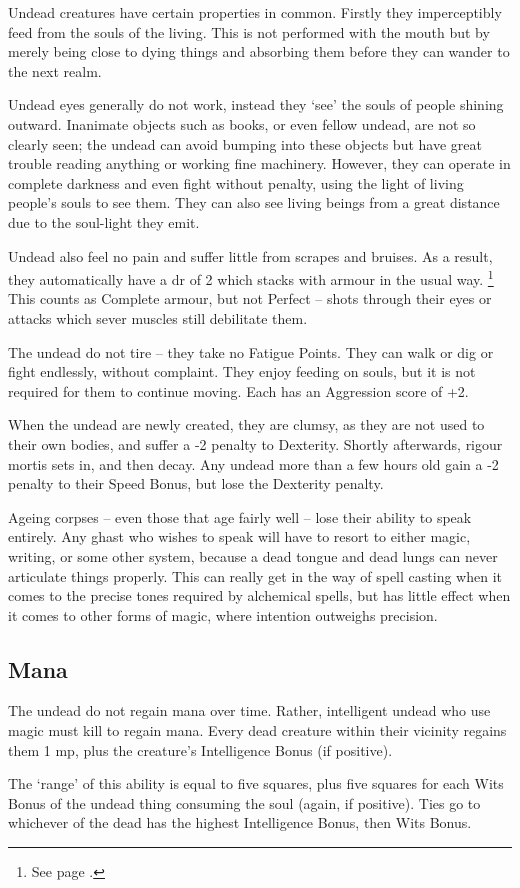\begin{multicols}{2}

\noindent
Undead creatures have certain properties in common.
Firstly they imperceptibly feed from the souls of the living.
This is not performed with the mouth but by merely being close to dying things and absorbing them before they can wander to the next realm.

Undead eyes generally do not work, instead they `see' the souls of people shining outward.
Inanimate objects such as books, or even fellow undead, are not so clearly seen; the undead can avoid bumping into these objects but have great trouble reading anything or working fine machinery.
However, they can operate in complete darkness and even fight without penalty, using the light of living people's souls to see them.
They can also see living beings from a great distance due to the soul-light they emit.

Undead also feel no pain and suffer little from scrapes and bruises.
As a result, they automatically have a \gls{dr} of 2 which stacks with armour in the usual way.%
\footnote{See page \pageref{stackingarmour}.}
This counts as Complete armour, but not Perfect -- shots through their eyes or attacks which sever muscles still debilitate them.

The undead do not tire -- they take no Fatigue Points. They can walk or dig or fight endlessly, without complaint.
They enjoy feeding on souls, but it is not required for them to continue moving.
Each has an Aggression score of +2.

When the undead are newly created, they are clumsy, as they are not used to their own bodies, and suffer a -2 penalty to Dexterity.
Shortly afterwards, rigour mortis sets in, and then decay.
Any undead more than a few hours old gain a -2 penalty to their Speed Bonus, but lose the Dexterity penalty.

Ageing corpses -- even those that age fairly well -- lose their ability to speak entirely.
Any ghast who wishes to speak will have to resort to either magic, writing, or some other system, because a dead tongue and dead lungs can never articulate things properly.
This can really get in the way of spell casting when it comes to the precise tones required by alchemical spells, but has little effect when it comes to other forms of magic, where intention outweighs precision.

\subsection{Mana}

The undead do not regain mana over time.
Rather, intelligent undead who use magic must kill to regain mana.
Every dead creature within their vicinity regains them 1 \gls{mp}, plus the creature's Intelligence Bonus (if positive).

The `range' of this ability is equal to five squares, plus five squares for each Wits Bonus of the undead thing consuming the soul (again, if positive).
Ties go to whichever of the dead has the highest Intelligence Bonus, then Wits Bonus.

\end{multicols}

